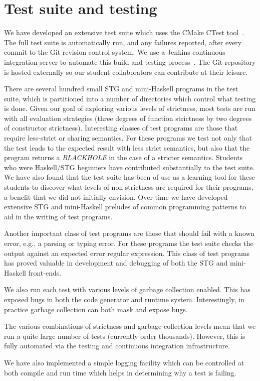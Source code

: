 \documentclass{llncs}
\begin{document}
\section{Test suite and testing}
\label{app:testing}
We have developed an extensive test suite which uses the CMake CTest
tool~\cite{cmake-book}. The full test suite is automatically run, and any
failures reported, after every commit to the Git revision control system. We
use a Jenkins continuous integration server to automate this build and testing
process~\cite{jenkins-book}. The Git repository is hosted externally so our
student collaborators can contribute at their leisure.

There are several hundred small STG and mini-Haskell programs in the test
suite, which is partitioned into a number of directories which control what
testing is done. Given our goal of exploring various levels of strictness,
most tests are run with all evaluation strategies (three degrees of function
strictness by two degrees of constructor strictness).  Interesting classes of
test programs are those that require less-strict or sharing semantics.  For
these programs we test not only that the test leads to the expected result
with less strict semantics, but also that the program returns a
\emph{BLACKHOLE} in the case of a stricter semantics. Students who were
Haskell/STG beginners have contributed substantially to the test suite. We
have also found that the test suite has been of use as a learning tool for
these students to discover what levels of non-strictness are required for their
programs, a benefit that we did not initially envision. Over time we have
developed extensive STG and mini-Haskell preludes of common programming
patterns to aid in the writing of test programs.

Another important class of test programs are those that should fail with a
known error, e.g., a parsing or typing error.  For these programs the test
suite checks the output against an expected error regular expression. This
class of test programs has proved valuable in development and debugging of
both the STG and mini-Haskell front-ends.

We also run each test with various levels of garbage collection enabled. This
has exposed bugs in both the code generator and runtime system.
Interestingly, in practice garbage collection can both mask and expose bugs.

The various combinations of strictness and garbage collection levels mean that
we run a quite large number of tests (currently order thousands). However,
this is fully automated via the testing and continuous integration
infrastructure.

We have also implemented a simple logging facility which can be controlled at 
both compile and run time which helps in determining why a test is failing.




\end{document}

